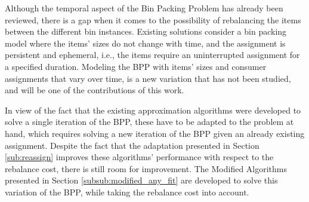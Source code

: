 Although the temporal aspect of the Bin Packing Problem has already been
reviewed, there is a gap when it comes to the possibility of rebalancing the
items between the different bin instances. Existing solutions consider a bin
packing model where the items' sizes do not change with time, and the assignment
is persistent and ephemeral, i.e., the items require an uninterrupted assignment
for a specified duration. Modeling the BPP with items' sizes and consumer
assignments that vary over time, is a new variation that has not been studied,
and will be one of the contributions of this work. 

In view of the fact that the existing approximation algorithms were developed to
solve a single iteration of the BPP, these have to be adapted to the problem at
hand, which requires solving a new iteration of the BPP given an already
existing assignment. Despite the fact that the adaptation presented in Section
\ref{sub:reassign} improves these algorithms' performance with respect to the
rebalance cost, there is still room for improvement. The Modified Algorithms
presented in Section \ref{subsub:modified_any_fit} are developed to solve this
variation of the BPP, while taking the rebalance cost into account.



